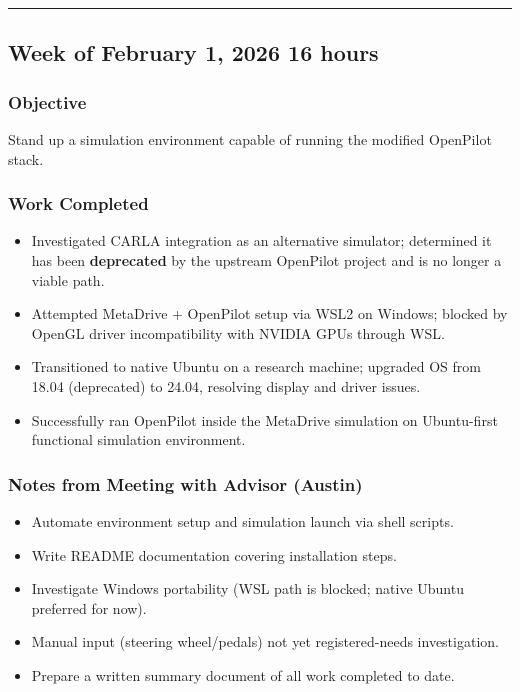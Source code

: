\documentclass[12pt]{article}
\begin{document}
\hrule\vspace{0.5em}

\subsection{Week of February 1, 2026 \hfill \normalfont\small 16 hours}

\subsubsection{Objective}
Stand up a simulation environment capable of running the modified OpenPilot stack.

\subsubsection{Work Completed}
\begin{itemize}
  \item Investigated CARLA integration as an alternative simulator; determined it has been \textbf{deprecated} by the upstream OpenPilot project and is no longer a viable path.
  \item Attempted MetaDrive + OpenPilot setup via WSL2 on Windows; blocked by OpenGL driver incompatibility with NVIDIA GPUs through WSL.
  \item Transitioned to native Ubuntu on a research machine; upgraded OS from 18.04 (deprecated) to 24.04, resolving display and driver issues.
  \item Successfully ran OpenPilot inside the MetaDrive simulation on Ubuntu-first functional simulation environment.
\end{itemize}

\subsubsection{Notes from Meeting with Advisor (Austin)}
\begin{notebox}
  \begin{itemize}
    \item Automate environment setup and simulation launch via shell scripts.
    \item Write README documentation covering installation steps.
    \item Investigate Windows portability (WSL path is blocked; native Ubuntu preferred for now).
    \item Manual input (steering wheel/pedals) not yet registered-needs investigation.
    \item Prepare a written summary document of all work completed to date.
  \end{itemize}
\end{notebox}
\end{document}
